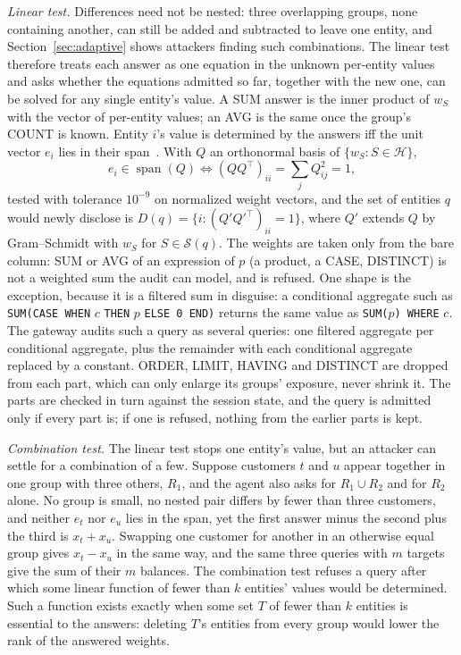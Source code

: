 \documentclass[sigconf,nonacm]{acmart}
\begin{document}
\emph{Linear test.} Differences need not be nested: three overlapping groups, none containing another, can still be added and subtracted to leave one entity, and Section~\ref{sec:adaptive} shows attackers finding such combinations. The linear test therefore treats each answer as one equation in the unknown per-entity values and asks whether the equations admitted so far, together with the new one, can be solved for any single entity's value. A SUM answer is the inner product of $w_S$ with the vector of per-entity values; an AVG is the same once the group's COUNT is known. Entity $i$'s value is determined by the answers iff the unit vector $e_i$ lies in their span~\cite{chin1982auditing}. With $Q$ an orthonormal basis of $\{w_S:S\in\mathcal{H}\}$,
\begin{equation}\label{eq:linear}
e_i\in\operatorname{span}(Q)\iff (QQ^{\top})_{ii}=\textstyle\sum_j Q_{ij}^2=1,
\end{equation}
tested with tolerance $10^{-9}$ on normalized weight vectors, and the set of entities $q$ would newly disclose is $D(q)=\{i: (Q'Q'^{\top})_{ii}=1\}$, where $Q'$ extends $Q$ by Gram--Schmidt with $w_S$ for $S\in\mathcal{S}(q)$. The weights are taken only from the bare column: SUM or AVG of an expression of $p$ (a product, a CASE, DISTINCT) is not a weighted sum the audit can model, and is refused. One shape is the exception, because it is a filtered sum in disguise: a conditional aggregate such as \texttt{SUM(CASE WHEN} $c$ \texttt{THEN} $p$ \texttt{ELSE 0 END)} returns the same value as \texttt{SUM(}$p$\texttt{) WHERE} $c$. The gateway audits such a query as several queries: one filtered aggregate per conditional aggregate, plus the remainder with each conditional aggregate replaced by a constant. ORDER, LIMIT, HAVING and DISTINCT are dropped from each part, which can only enlarge its groups' exposure, never shrink it. The parts are checked in turn against the session state, and the query is admitted only if every part is; if one is refused, nothing from the earlier parts is kept.

\emph{Combination test.} The linear test stops one entity's value, but an attacker can settle for a combination of a few. Suppose customers $t$ and $u$ appear together in one group with three others, $R_1$, and the agent also asks for $R_1\cup R_2$ and for $R_2$ alone. No group is small, no nested pair differs by fewer than three customers, and neither $e_t$ nor $e_u$ lies in the span, yet the first answer minus the second plus the third is $x_t+x_u$. Swapping one customer for another in an otherwise equal group gives $x_t-x_u$ in the same way, and the same three queries with $m$ targets give the sum of their $m$ balances. The combination test refuses a query after which some linear function of fewer than $k$ entities' values would be determined. Such a function exists exactly when some set $T$ of fewer than $k$ entities is essential to the answers: deleting $T$'s entities from every group would lower the rank of the answered weights.
\end{document}
